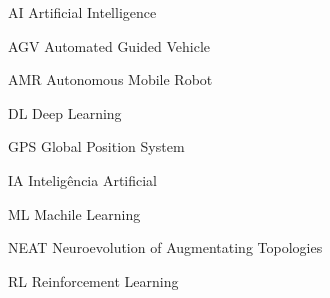 \begin{siglas}
    \item[AI] Artificial Intelligence
    \item[AGV] Automated Guided Vehicle
    \item[AMR] Autonomous Mobile Robot
    \item[DL] Deep Learning
    \item[GPS] Global Position System
    \item[IA] Intelig{\^e}ncia Artificial
    \item[ML] Machile Learning
    \item[NEAT] Neuroevolution of Augmentating Topologies
    \item[RL] Reinforcement Learning
\end{siglas}

